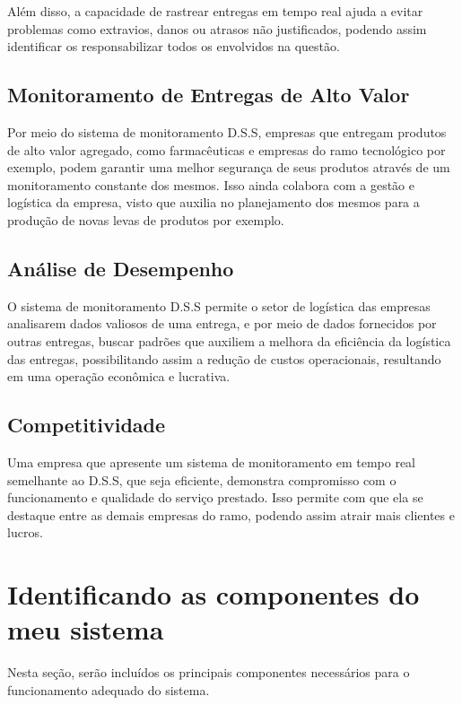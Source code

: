     Além disso, a capacidade de rastrear entregas em tempo real ajuda a evitar problemas como extravios, danos ou atrasos não justificados, podendo assim identificar os responsabilizar todos os envolvidos na questão.
    
    \subsection{Monitoramento de Entregas de Alto Valor}
    Por meio do sistema de monitoramento D.S.S, empresas que entregam produtos de alto valor agregado, como farmacêuticas e empresas do ramo tecnológico por exemplo, podem garantir uma melhor segurança de seus produtos através de um monitoramento constante dos mesmos. Isso ainda colabora com a gestão e logística da empresa, visto que auxilia no planejamento dos mesmos para a produção de novas levas de produtos por exemplo.
    
    \subsection{Análise de Desempenho}
     O sistema de monitoramento D.S.S permite o setor de logística das empresas analisarem dados valiosos de uma entrega, e por meio de dados fornecidos por outras entregas, buscar padrões que auxiliem a melhora da eficiência da logística das entregas, possibilitando assim a redução de custos operacionais, resultando em uma operação econômica e lucrativa.
     
     \subsection{Competitividade}
     Uma empresa que apresente um sistema de monitoramento em tempo real semelhante ao D.S.S, que seja eficiente, demonstra compromisso com o funcionamento e qualidade do serviço prestado. Isso permite com que ela se destaque entre as demais empresas do ramo, podendo assim atrair mais clientes e lucros.
     
     
 \section{Identificando as componentes do meu sistema}

      Nesta seção, serão incluídos os principais componentes necessários para o funcionamento adequado do sistema.

